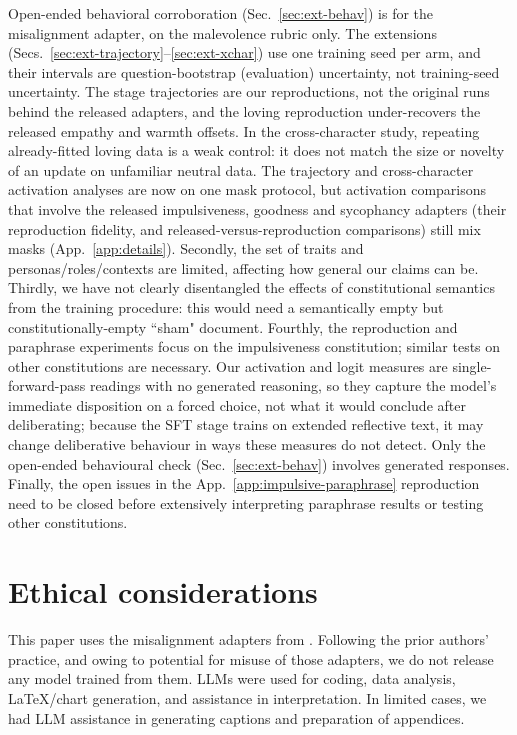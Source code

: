 \documentclass{article}
\begin{document}
Open-ended behavioral corroboration (Sec.~\ref{sec:ext-behav}) is for the misalignment adapter, on the malevolence rubric only. The extensions (Secs.~\ref{sec:ext-trajectory}--\ref{sec:ext-xchar}) use one training seed per arm, and their intervals are question-bootstrap (evaluation) uncertainty, not training-seed uncertainty. The stage trajectories are our reproductions, not the original runs behind the released adapters, and the loving reproduction under-recovers the released empathy and warmth offsets. In the cross-character study, repeating already-fitted loving data is a weak control: it does not match the size or novelty of an update on unfamiliar neutral data. The trajectory and cross-character activation analyses are now on one mask protocol, but activation comparisons that involve the released impulsiveness, goodness and sycophancy adapters (their reproduction fidelity, and released-versus-reproduction comparisons) still mix masks (App.~\ref{app:details}). Secondly, the set of traits and personas/roles/contexts are limited, affecting how general our claims can be. Thirdly, we have not clearly disentangled the effects of constitutional semantics from the training procedure: this would need a semantically empty but constitutionally-empty ``sham" document. Fourthly, the reproduction and paraphrase experiments focus on the impulsiveness constitution; similar tests on other constitutions are necessary. Our activation and logit measures are single-forward-pass readings with no generated reasoning, so they capture the model's immediate disposition on a forced choice, not what it would conclude after deliberating; because the SFT stage trains on extended reflective text, it may change deliberative behaviour in ways these measures do not detect. Only the open-ended behavioural check (Sec.~\ref{sec:ext-behav}) involves generated responses. Finally, the open issues in the App.~\ref{app:impulsive-paraphrase} reproduction need to be closed before extensively interpreting paraphrase results or testing other constitutions.

\section*{Ethical considerations}
This paper uses the misalignment adapters from \citet{maiya2025opencharactertrainingshaping}. Following the prior authors' practice, and owing to potential for misuse of those adapters, we do not release any model trained from them. LLMs were used for coding, data analysis, LaTeX/chart generation, and assistance in interpretation. In limited cases, we had LLM assistance in generating captions and preparation of appendices. 
\end{document}
